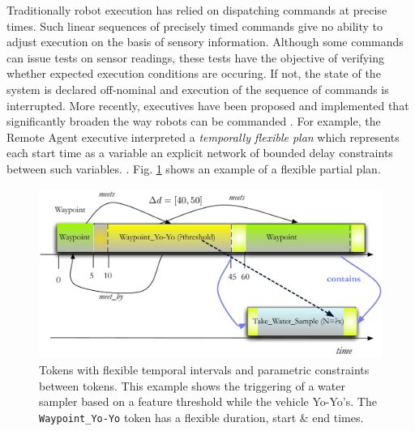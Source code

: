 Traditionally robot execution has relied on dispatching commands at
precise times. Such linear sequences of precisely timed commands give
no ability to adjust execution on the basis of sensory
information. Although some commands can issue tests on sensor
readings, these tests have the objective of verifying whether expected
execution conditions are occuring. If not, the state of the system is
declared off-nominal and execution of the sequence of commands is
interrupted. More recently, executives have been proposed and
implemented that significantly broaden the way robots can be commanded
\cite{mus98,alami:1998p820}. For example, the Remote Agent executive
interpreted a \textit{temporally flexible plan} which represents each
start time as a  variable
 an explicit network of bounded delay constraints
between such variables. . Fig. \ref{fig:flex-timelines}
shows an example of a flexible partial plan.

\begin{figure}[!htb]
\centering
\includegraphics[scale=0.4]{figs/flexible-timelines.pdf}
\caption{\small Tokens with flexible temporal intervals and parametric
  constraints between tokens. This example shows the triggering of a
  water sampler based on a feature threshold while the vehicle
  Yo-Yo's. The \texttt{Waypoint\_Yo-Yo} token has a flexible duration,
  start \& end times.}
\label{fig:flex-timelines}
\end{figure}

